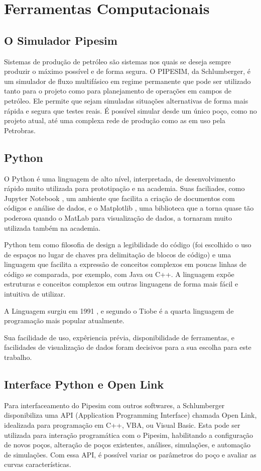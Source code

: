 
\chapter{Ferramentas Computacionais} \label{chap:4}


\section{O Simulador Pipesim}
Sistemas de produção de petróleo são sistemas nos quais se deseja sempre produzir o máximo possível e de forma segura.
O PIPESIM, da Schlumberger, é um simulador de fluxo multifásico em regime permanente que pode ser utilizado tanto para o projeto como para planejamento de operações em campos de petróleo. Ele permite que sejam simuladas situações alternativas de forma mais rápida e segura que testes reais. É possível simular desde um único poço, como no projeto atual, até uma complexa rede de produção como as em uso pela Petrobras.

\section{Python}

O Python é uma linguagem de alto nível, interpretada, de desenvolvimento rápido muito utilizada para prototipação e na academia. Suas faciliades, como Jupyter Notebook \cite{jupyter}, um ambiente que facilita a criação de documentos com códigos e análise de dados, e o Matplotlib \cite{matplotlib}, uma biblioteca que a torna quase tão poderosa quando o MatLab para visualização de dados, a tornaram muito utilizada também na academia.

Python tem como filosofia de design a legibilidade do código (foi escolhido o uso de espaços no lugar de chaves pra delimitação de blocos de código) e uma linguagem que facilita a expressão de conceitos complexos em poucas linhas de código se comparada, por exemplo, com Java ou C++. A linguagem expõe estruturas e conceitos complexos em outras linguagens de forma mais fácil e intuitiva de utilizar.

A Linguagem surgiu em 1991 \cite{pythonHistory}, e segundo o Tiobe \cite{tiobe} é a quarta linguagem de programação mais popular atualmente.

Sua facilidade de uso, expêriencia prévia, disponibilidade de ferramentas, e facilidades de visualização de dados foram decisivos para a sua escolha para este trabalho. 

\section{Interface Python e Open Link}
Para interfaceamento do Pipesim com outros softwares, a Schlumberger disponibiliza uma API (Application Programming Interface) chamada Open Link, idealizada para programação em C++, VBA, ou Visual Basic. Esta pode ser utilizada para interação programática com o Pipesim, habilitando a configuração de novos poços, alteração de poços existentes, análises, simulações, e automação de simulações. Com essa API, é possível variar os parâmetros do poço e avaliar as curvas características.




